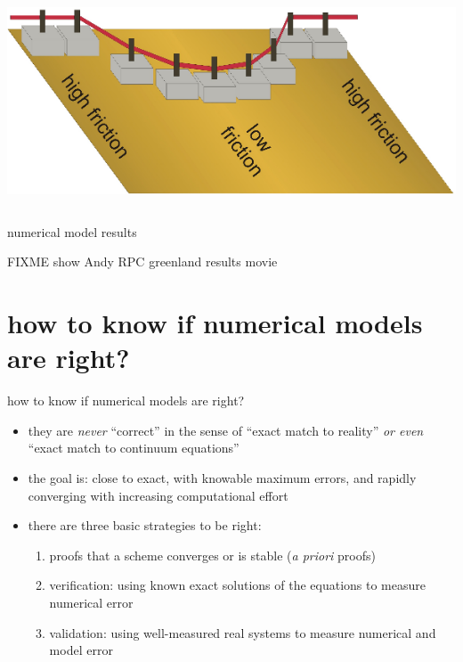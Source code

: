 \documentclass[10pt,hyperref={pdfpagelabels=true}]{beamer}
\begin{document}
\begin{frame}
\begin{columns}
\begin{column}{0.4\textwidth}
\vspace{0.3in}

\includegraphics[width=1.1\textwidth]{schoof-sliders}
\end{column}
\end{columns}
\end{frame}


\begin{frame}{numerical model results}

FIXME show Andy RPC greenland results movie
\end{frame}


\section[on being right]{how to know if numerical models are right?}


\begin{frame}{how to know if numerical models are right?}

\begin{itemize}
\item they are \emph{never} ``correct'' in the sense of ``exact match to reality'' \emph{or even} ``exact match to continuum equations''
\item the \alert{goal} is: \alert{close to exact, with knowable maximum errors, and rapidly converging with increasing computational effort}

\bigskip
\item<2> there are three basic strategies to be right:
    \begin{enumerate}
    \item proofs that a scheme converges or is stable (\emph{a priori} proofs)
    \item \alert{verification}: using known exact solutions of the equations to measure numerical error
    \item \alert{validation}: using well-measured real systems to measure numerical and model error
    \end{enumerate}
\end{itemize}
\end{frame}
\end{document}
